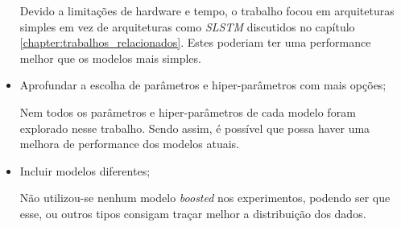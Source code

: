 \begin{itemize}
    Devido a limitações de hardware e tempo, o trabalho focou em arquiteturas simples em vez de arquiteturas como \textit{\acrshort{SLSTM}} discutidos no capítulo \ref{chapter:trabalhos_relacionados}. Estes poderiam ter uma performance melhor que os modelos mais simples.
    
    \item Aprofundar a escolha de parâmetros e hiper-parâmetros com mais opções;
    
    Nem todos os parâmetros e hiper-parâmetros de cada modelo foram explorado nesse trabalho. Sendo assim, é possível que possa haver uma melhora de performance dos modelos atuais.
    
    \item Incluir modelos diferentes;
    
    Não utilizou-se nenhum modelo \textit{boosted} nos experimentos, podendo ser que esse, ou outros tipos consigam traçar melhor a distribuição dos dados.
    
\end{itemize}

